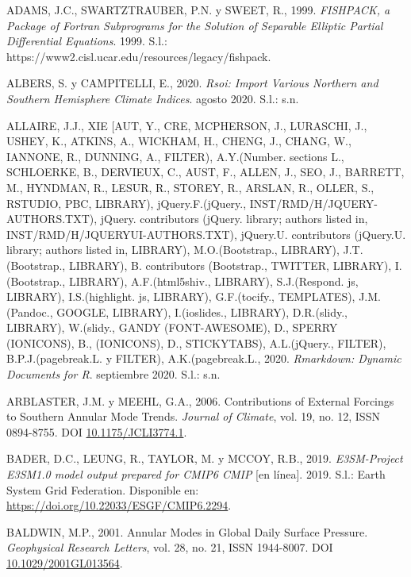 \documentclass[12pt,oneside,a4paper]{reedthesis}
\newlength{\cslhangindent}
\newenvironment{CSLReferences}[2] %
 {%
  \setlength{\parindent}{0pt}
  \ifodd #1 \everypar{\setlength{\hangindent}{\cslhangindent}}\ignorespaces\fi
  \ifnum #2 > 0
  \setlength{\parskip}{#2\baselineskip}
  \fi
 }%
 {}
\begin{document}
\begin{CSLReferences}{1}{0}
\leavevmode{}%
ADAMS, J.C., SWARTZTRAUBER, P.N. y SWEET, R., 1999. \emph{{FISHPACK}, a Package of {Fortran} Subprograms for the Solution of Separable Elliptic Partial Differential Equations}. 1999. S.l.: https://www2.cisl.ucar.edu/resources/legacy/fishpack.

\leavevmode{}%
ALBERS, S. y CAMPITELLI, E., 2020. \emph{Rsoi: {Import Various Northern} and {Southern Hemisphere Climate Indices}}. agosto 2020. S.l.: s.n.

\leavevmode{}%
ALLAIRE, J.J., XIE {[}AUT, Y., CRE, MCPHERSON, J., LURASCHI, J., USHEY, K., ATKINS, A., WICKHAM, H., CHENG, J., CHANG, W., IANNONE, R., DUNNING, A., FILTER), A.Y.(Number. sections L., SCHLOERKE, B., DERVIEUX, C., AUST, F., ALLEN, J., SEO, J., BARRETT, M., HYNDMAN, R., LESUR, R., STOREY, R., ARSLAN, R., OLLER, S., RSTUDIO, PBC, LIBRARY), jQuery.F.(jQuery., INST/RMD/H/JQUERY-AUTHORS.TXT), jQuery. contributors (jQuery. library; authors listed in, INST/RMD/H/JQUERYUI-AUTHORS.TXT), jQuery.U. contributors (jQuery.U. library; authors listed in, LIBRARY), M.O.(Bootstrap., LIBRARY), J.T.(Bootstrap., LIBRARY), B. contributors (Bootstrap., TWITTER, LIBRARY), I.(Bootstrap., LIBRARY), A.F.(html5shiv., LIBRARY), S.J.(Respond. js, LIBRARY), I.S.(highlight. js, LIBRARY), G.F.(tocify., TEMPLATES), J.M.(Pandoc., GOOGLE, LIBRARY), I.(ioslides., LIBRARY), D.R.(slidy., LIBRARY), W.(slidy., GANDY (FONT-AWESOME), D., SPERRY (IONICONS), B., (IONICONS), D., STICKYTABS), A.L.(jQuery., FILTER), B.P.J.(pagebreak.L. y FILTER), A.K.(pagebreak.L., 2020. \emph{Rmarkdown: {Dynamic Documents} for {R}}. septiembre 2020. S.l.: s.n.

\leavevmode{}%
ARBLASTER, J.M. y MEEHL, G.A., 2006. Contributions of {External Forcings} to {Southern Annular Mode Trends}. \emph{Journal of Climate}, vol. 19, no. 12, ISSN 0894-8755. DOI \href{https://doi.org/10.1175/JCLI3774.1}{10.1175/JCLI3774.1}.

\leavevmode{}%
BADER, D.C., LEUNG, R., TAYLOR, M. y MCCOY, R.B., 2019. \emph{E3SM-Project E3SM1.0 model output prepared for CMIP6 CMIP} {[}en línea{]}. 2019. S.l.: Earth System Grid Federation. Disponible en: \url{https://doi.org/10.22033/ESGF/CMIP6.2294}.

\leavevmode{}%
BALDWIN, M.P., 2001. Annular Modes in Global Daily Surface Pressure. \emph{Geophysical Research Letters}, vol. 28, no. 21, ISSN 1944-8007. DOI \href{https://doi.org/10.1029/2001GL013564}{10.1029/2001GL013564}.


\end{CSLReferences}
\end{document}
